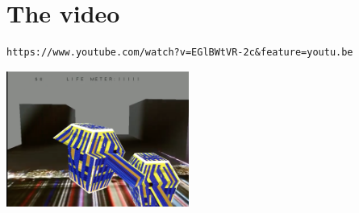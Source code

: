 \documentclass{article}
\begin{document}
\section{The video}

\begin{lstlisting}
https://www.youtube.com/watch?v=EGlBWtVR-2c&feature=youtu.be
\end{lstlisting}

\includegraphics[height=1.75in]{pic1.PNG}


\pagebreak

	
\end{document}
